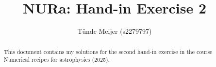 \documentclass[a4paper,10pt]{article}
\title{NURa: Hand-in Exercise 2}
\author{Tünde Meijer (s2279797)}
\begin{document}
\maketitle

\begin{abstract}
 This document contains my solutions for the second hand-in exercise in the 
 course Numerical recipes for astrophysics (2025).
\end{abstract}




\end{document}
